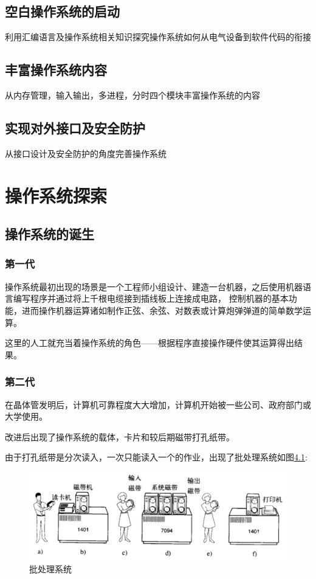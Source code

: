 \documentclass{swfcthesis}
\begin{document}
	\section{空白操作系统的启动}
	利用汇编语言及操作系统相关知识探究操作系统如何从电气设备到软件代码的衔接
	
	\section{丰富操作系统内容}
	从内存管理，输入输出，多进程，分时四个模块丰富操作系统的内容
	
	\section{实现对外接口及安全防护}
	从接口设计及安全防护的角度完善操作系统
	
\chapter{操作系统探索}

	\section{操作系统的诞生}

		\subsection{第一代}

		操作系统最初出现的场景是一个工程师小组设计、建造一台机器，之后使用机器语言编写程序并通过将上千根电缆接到插线板上连接成电路，
		控制机器的基本功能，进而操作机器运算诸如制作正弦、余弦、对数表或计算炮弹弹道的简单数学运算。

		这里的人工就充当着操作系统的角色——根据程序直接操作硬件使其运算得出结果。

		\subsection{第二代}

		在晶体管发明后，计算机可靠程度大大增加，计算机开始被一些公司、政府部门或大学使用。

		改进后出现了操作系统的载体，卡片和较后期磁带打孔纸带。

        由于打孔纸带是分次读入，一次只能读入一个的作业，出现了批处理系统如图\ref{fig:btss}: 

			\begin{figure}[h]
				\centering
				\includegraphics[width=.8\textwidth]{fig/btss.png}
				\caption{批处理系统}
				\label{fig:btss}
			\end{figure}
\end{document}
